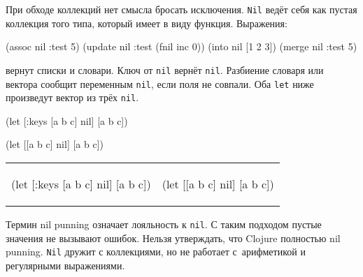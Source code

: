 При обходе коллекций нет смысла бросать исключения. \verb|Nil| ведёт себя как
пустая коллекция того типа, который имеет в виду функция. Выражения:

\begin{english}
  \begin{clojure}
(assoc nil :test 5)
(update nil :test (fnil inc 0))
(into nil [1 2 3])
(merge nil {:test 5})
  \end{clojure}
\end{english}

\noindent
вернут списки и словари. Ключ от \verb|nil| вернёт \verb|nil|. Разбиение словаря
или вектора сообщит переменным \verb|nil|, если поля не совпали. Оба \verb|let|
ниже произведут вектор из трёх \verb|nil|.

\ifnarrow

\begin{english}
  \begin{clojure}
(let [{:keys [a b c]} nil]
  [a b c])
  \end{clojure}

\splitter

  \begin{clojure}
(let [[a b c] nil]
  [a b c])
  \end{clojure}
\end{english}

\else

\begin{english}
\noindent
\begin{tabular}{ @{}p{5.5cm} @{}p{4cm} }

  \begin{clojure}
(let [{:keys [a b c]} nil]
  [a b c])
  \end{clojure}

&

  \begin{clojure}
(let [[a b c] nil]
  [a b c])
  \end{clojure}

\end{tabular}

\end{english}

\fi


Термин nil punning означает лояльность к \verb|nil|. С таким подходом
пустые значения не вызывают ошибок. Нельзя утверждать, что Clojure полностью
nil punning. \verb|Nil| дружит с коллекциями, но не работает с~арифметикой
и регулярными выражениями.

